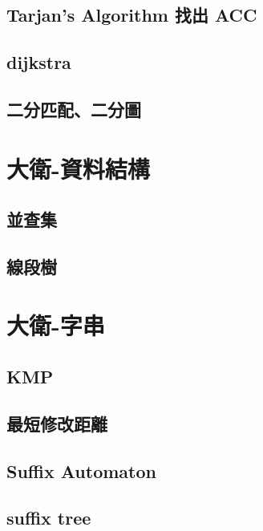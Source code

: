 \subsection{Tarjan's Algorithm 找出 ACC}
\raggedbottom
\hrulefill
\subsection{dijkstra}
\raggedbottom
\hrulefill
\subsection{二分匹配、二分圖}
\raggedbottom
\hrulefill

\section{大衛-資料結構}
\subsection{並查集}
\raggedbottom
\hrulefill
\subsection{線段樹}
\raggedbottom
\hrulefill

\section{大衛-字串}
\subsection{KMP}
\raggedbottom
\hrulefill
\subsection{最短修改距離}
\raggedbottom
\hrulefill
\subsection{Suffix Automaton}
\raggedbottom
\hrulefill
\subsection{suffix tree}
\raggedbottom
\hrulefill

